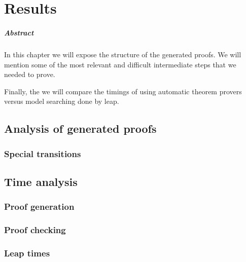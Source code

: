 \chapter{Results\label{chap:results}}

\paragraph{Abstract} In this chapter we will expose the structure of the generated proofs. We will mention some of the most relevant and difficult intermediate steps that we needed to prove.

Finally, the we will compare the timings of using automatic theorem provers versus model searching done by \gls{leap}.

\section{Analysis of generated proofs}

\subsection{Special transitions}

\section{Time analysis}

\subsection{Proof generation}

\subsection{Proof checking}


\subsection{Leap times}



